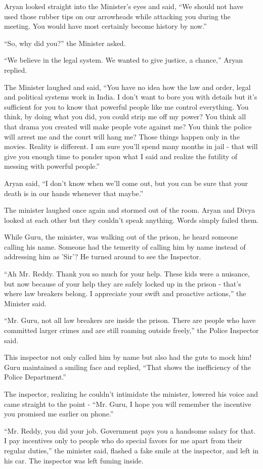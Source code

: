 Aryan looked straight into the Minister's eyes and said, “We should not have
used those rubber tips on our arrowheads while attacking you during the meeting.
You would have most certainly become history by now.”

“So, why did you?” the Minister asked.

“We believe in the legal system. We wanted to give justice, a chance,” Aryan
replied.

The Minister laughed and said, “You have no idea how the law and order, legal
and political systems work in India. I don't want to bore you with details but
it's sufficient for you to know that powerful people like me control everything.
You think, by doing what you did, you could strip me off my power? You think all
that drama you created will make people vote against me? You think the police
will arrest me and the court will hang me? Those things happen only in the
movies. Reality is different. I am sure you'll spend many months in jail - that
will give you enough time to ponder upon what I said and realize the futility of
messing with powerful people.”

Aryan said, “I don't know when we'll come out, but you can be sure that your
death is in our hands whenever that maybe.”

The minister laughed once again and stormed out of the room. Aryan and Divya
looked at each other but they couldn't speak anything. Words simply failed them.

While Guru, the minister, was walking out of the prison, he heard someone
calling his name. Someone had the temerity of calling him by name instead of
addressing him as 'Sir'? He turned around to see the Inspector.

“Ah Mr. Reddy. Thank you so much for your help. These kids were a nuisance, but
now because of your help they are safely locked up in the prison - that's where
law breakers belong. I appreciate your swift and proactive actions,” the
Minister said.

“Mr. Guru, not all law breakers are inside the prison. There are people who have
committed larger crimes and are still roaming outside freely,” the Police
Inspector said.

This inspector not only called him by name but also had the guts to mock him!
Guru maintained a smiling face and replied, “That shows the inefficiency of the
Police Department.”

The inspector, realizing he couldn't intimidate the minister, lowered his voice
and came straight to the point - “Mr. Guru, I hope you will remember the
incentive you promised me earlier on phone.”

“Mr. Reddy, you did your job. Government pays you a handsome salary for that. I
pay incentives only to people who do special favors for me apart from their
regular duties,” the minister said, flashed a fake smile at the inspector, and
left in his car. The inspector was left fuming inside.